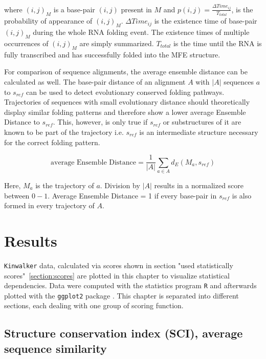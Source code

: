 \documentclass[ twoside,openright,titlepage,numbers=noenddot,headinclude,%
                footinclude=false, cleardoublepage=empty,abstractoff, %
                BCOR=5mm,paper=a4,fontsize=11pt,%
                ngerman,american,%
                ]{scrreprt}
\begin{document}
where $(i,j)_{M}$ is a base-pair $(i,j)$ present in $M$ and $p(i,j) =
\frac{\Delta Time_{ij}}{T_{total}}$, is the probability of appearance of
$(i,j)_{M}$. $\Delta Time_{ij}$ is the existence time of base-pair $(i,j)_{M}$ during the whole RNA folding event. The existence times of multiple occurrences of $(i,j)_{M}$ are simply summarized. $T_{total}$ is the time until the RNA is fully transcribed and has successfully folded into the MFE structure.


For comparison of sequence alignments, the average ensemble distance can be
calculated as well. The base-pair distance of an alignment $A$ with $|A|$
sequences $a$ to $s_{ref}$ can be used to detect evolutionary conserved
folding pathways. Trajectories of sequences with small evolutionary
distance should theoretically display similar folding patterns and
therefore show a lower average Ensemble Distance to $s_{ref}$. This,
however, is only true if $s_{ref}$ or substructures of it are known to be part of the
trajectory
i.e. $s_{ref}$ is an intermediate structure necessary for the
correct folding pattern.

\begin{equation}
\mbox{average Ensemble Distance} = \frac{1}{|A|} \sum\limits_{a\in A} d_E(M_a,s_{ref})
\label{eq:meanEnsembleDistance}	
\end{equation}

Here, $M_a$ is the trajectory of $a$. Division by $|A|$ results in a
normalized score between $0-1$.
Average Ensemble Distance = 1 if every base-pair in $s_{ref}$ is also
formed in every trajectory of $A$.



\chapter{Results}




\texttt{Kinwalker} data, calculated via scores shown in section "used
statistically scores"~\ref{section:scores} are plotted in this chapter to
visualize statistical dependencies. Data were computed with the statistics
program \texttt{R}\cite{R} and afterwards plotted with the \texttt{ggplot2} package
\cite{ggplot2}. This chapter is separated into different sections, each
dealing with one group of scoring function.
	
\section{Structure conservation index (SCI), average sequence similarity}
\end{document}

